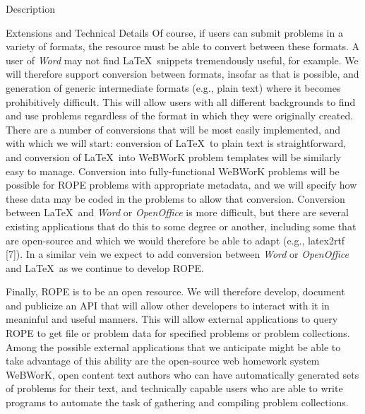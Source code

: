 \documentclass[11pt]{article}
\begin{document}
\begin{section}{Description}
\begin{subsection}{Extensions and Technical Details}
Of course, if users can submit problems in a variety of formats, the resource 
must be able to convert between these formats.
A user of
\emph{Word} may not find \LaTeX\ snippets tremendously useful, for
example.  We will therefore support conversion between formats, insofar as
that is possible, and generation of generic intermediate formats (e.g.,
plain text) where it becomes prohibitively difficult.  This will allow
users with all different backgrounds to find and use problems regardless
of the format in which they were originally created.  There are a number
of conversions that will be most easily implemented, and with which we
will start: conversion of \LaTeX\ to plain text is straightforward, and
conversion of \LaTeX\ into WeBWorK problem templates will be similarly
easy to manage.  Conversion into fully-functional WeBWorK problems will
be possible for ROPE problems with appropriate metadata, and we will
specify how these data may be coded in the problems to allow that
conversion.  Conversion between \LaTeX\ and \emph{Word} or
\emph{OpenOffice} is more difficult, but there are several existing
applications that do this to some degree or another, including some that
are open-source and which we would therefore be able to adapt (e.g.,
latex2rtf [7]).  In a similar vein we expect to add conversion between
\emph{Word} or \emph{OpenOffice} and \LaTeX\ as we continue to develop
ROPE. 

Finally, ROPE is to be an open resource.  We will therefore develop,
document and publicize an API that will allow other developers to interact
with it in meaninful and useful manners.  This will allow external
applications to query ROPE to get file or problem data for specified
problems or problem collections.  Among the possible external applications
that we anticipate might be able to take advantage of this ability are
the open-source web homework system WeBWorK, open content text authors who
can have automatically generated sets of problems for their text, and
technically capable users who are able to write programs to automate the
task of gathering and compiling problem collections.

\end{subsection}

\end{section}
\end{document}
